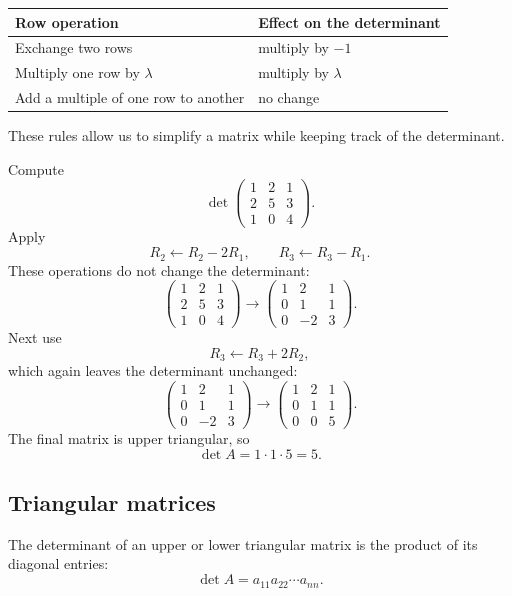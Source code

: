 \begin{center}
\begin{tabular}{ll}
\textbf{Row operation} & \textbf{Effect on the determinant}\\
\hline
Exchange two rows & multiply by \(-1\)\\
Multiply one row by \(\lambda\) & multiply by \(\lambda\)\\
Add a multiple of one row to another & no change
\end{tabular}
\end{center}

These rules allow us to simplify a matrix while keeping track of the determinant.

\begin{examplebox}
Compute
\[
\det\begin{pmatrix}
1&2&1\\
2&5&3\\
1&0&4
\end{pmatrix}.
\]
Apply
\[
R_2\leftarrow R_2-2R_1,
\qquad
R_3\leftarrow R_3-R_1.
\]
These operations do not change the determinant:
\[
\begin{pmatrix}
1&2&1\\
2&5&3\\
1&0&4
\end{pmatrix}
\longrightarrow
\begin{pmatrix}
1&2&1\\
0&1&1\\
0&-2&3
\end{pmatrix}.
\]
Next use
\[
R_3\leftarrow R_3+2R_2,
\]
which again leaves the determinant unchanged:
\[
\begin{pmatrix}
1&2&1\\
0&1&1\\
0&-2&3
\end{pmatrix}
\longrightarrow
\begin{pmatrix}
1&2&1\\
0&1&1\\
0&0&5
\end{pmatrix}.
\]
The final matrix is upper triangular, so
\[
\det A=1\cdot1\cdot5=5.
\]
\end{examplebox}

\subsection{Triangular matrices}

\begin{theorembox}
The determinant of an upper or lower triangular matrix is the product of its diagonal entries:
\[
\det A=a_{11}a_{22}\cdots a_{nn}.
\]
\end{theorembox}


